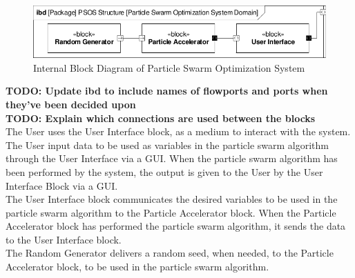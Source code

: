 \begin{figure}[!h]
	\centering
	\includegraphics[width=0.8\linewidth]{diagram/ibd_particle_swarm_optimization_system.pdf}
	\caption{Internal Block Diagram of Particle Swarm Optimization System}
	\label{fig:ibd}
\end{figure}

\textbf{TODO: Update ibd to include names of flowports and ports when they've been decided upon}\\
\textbf{TODO: Explain which connections are used between the blocks}\\

The User uses the User Interface block, as a medium to interact with the system. The User input data to be used as variables in the particle swarm algorithm through the User Interface via a GUI. When the particle swarm algorithm has been performed by the system, the output is given to the User by the User Interface Block via a GUI.\\

The User Interface block communicates the desired variables to be used in the particle swarm algorithm to the Particle Accelerator block. When the Particle Accelerator block has performed the particle swarm algorithm, it sends the data to the User Interface block.\\

The Random Generator delivers a random seed, when needed, to the Particle Accelerator block, to be used in the particle swarm algorithm.\\

